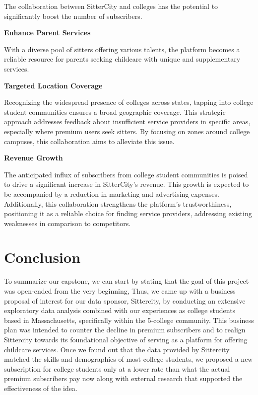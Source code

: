 \documentclass[12pt]{article}
\begin{document}
The collaboration between SitterCity and colleges has the potential to
significantly boost the number of subscribers.~

\textbf{Enhance Parent Services}

With a diverse pool of sitters offering various talents, the platform
becomes a reliable resource for parents seeking childcare with unique
and supplementary services.

\textbf{Targeted Location Coverage}

Recognizing the widespread presence of colleges across states, tapping
into college student communities ensures a broad geographic coverage.
This strategic approach addresses feedback about insufficient service
providers in specific areas, especially where premium users seek
sitters. By focusing on zones around college campuses, this
collaboration aims to alleviate this issue.

\textbf{Revenue Growth}

The anticipated influx of subscribers from college student communities
is poised to drive a significant increase in SitterCity's revenue. This
growth is expected to be accompanied by a reduction in marketing and
advertising expenses. Additionally, this collaboration strengthens the
platform's trustworthiness, positioning it as a reliable choice for
finding service providers, addressing existing weaknesses in comparison
to competitors.

\hypertarget{conclusion}{%
\section{Conclusion}\label{conclusion}}

To summarize our capstone, we can start by stating that the goal of this
project was open-ended from the very beginning, Thus, we came up with a
business proposal of interest for our data sponsor, Sittercity, by
conducting an extensive exploratory data analysis combined with our
experiences as college students based in Massachusetts, specifically
within the 5-college community. This business plan was intended to
counter the decline in premium subscribers and to realign Sittercity
towards its foundational objective of serving as a platform for offering
childcare services. Once we found out that the data provided by
Sittercity matched the skills and demographics of most college students,
we proposed a new subscription for college students only at a lower rate
than what the actual premium subscribers pay now along with external
research that supported the effectiveness of the idea.~
\end{document}
